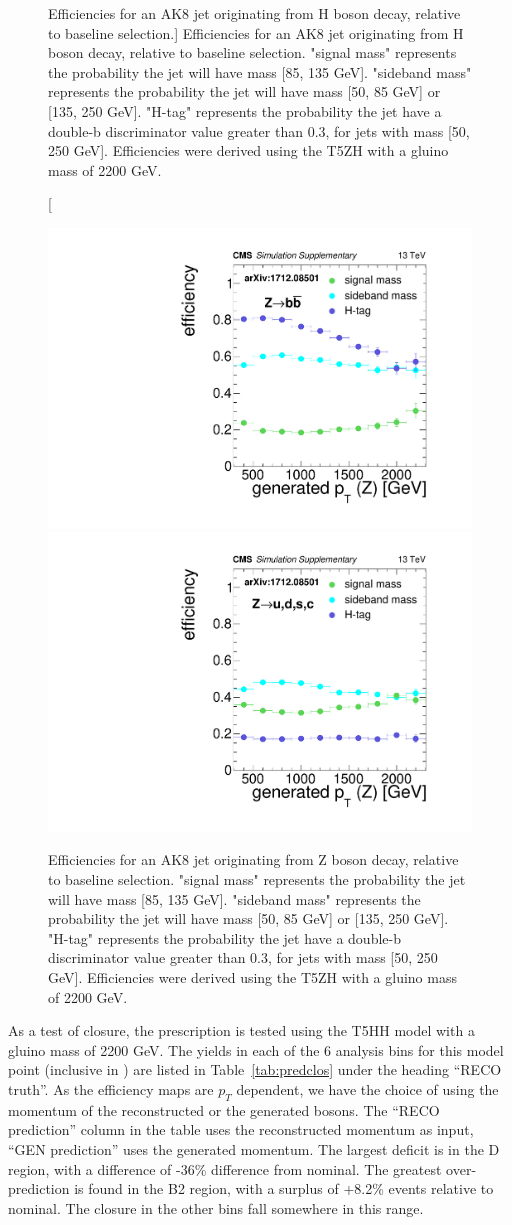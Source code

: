 \begin{figure}[hbp!]
\caption
[Efficiencies for an AK8 jet originating from H boson decay, relative to baseline selection.]
{Efficiencies for an AK8 jet originating from H boson decay, relative to baseline selection. "signal mass" represents the probability the jet will have mass [85, 135 GeV]. "sideband mass" represents the probability the jet will have mass [50, 85 GeV] or [135, 250 GeV]. "H-tag" represents the probability the jet have a double-b discriminator value greater than 0.3, for jets with mass [50, 250 GeV]. Efficiencies were derived using the T5ZH  with a gluino mass of 2200 GeV. }
\label{fig:effH}
\end{figure}

\begin{figure}[hbp!]
\centering
\includegraphics[width=0.425\linewidth]{figs/CMS-SUS-17-006_Figure-aux_011.pdf}
\includegraphics[width=0.425\linewidth]{figs/CMS-SUS-17-006_Figure-aux_012.pdf}
\caption[Efficiencies for an AK8 jet originating from Z boson decay, relative to baseline selection.]
{Efficiencies for an AK8 jet originating from Z boson decay, relative to baseline selection. "signal mass" represents the probability the jet will have mass  [85, 135 GeV]. "sideband mass" represents the probability the jet will have mass [50, 85 GeV] or [135, 250 GeV]. "H-tag" represents the probability the jet have a double-b discriminator value greater than 0.3, for jets with mass [50, 250 GeV]. Efficiencies were derived using the T5ZH  with a gluino mass of 2200 GeV.
}
\label{fig:effZ}
\end{figure}

As a test of closure, the prescription is tested using the T5HH model with a gluino mass of 2200 GeV. The yields in each of the 6 analysis bins for this model point (inclusive in \ptmiss) are listed in Table~\ref{tab:predclos} under the heading ``RECO truth''. As the efficiency maps are $p_{T}$ dependent, we have the choice of using the momentum of the reconstructed or the generated bosons. The ``RECO prediction'' column in the table uses the reconstructed momentum as input, ``GEN prediction'' uses the generated momentum. The largest deficit is in the D region, with a difference of -36\% difference from nominal. The greatest over-prediction is found in the B2 region, with a surplus of +8.2\% events relative to nominal. The closure in the other bins fall somewhere in this range.

